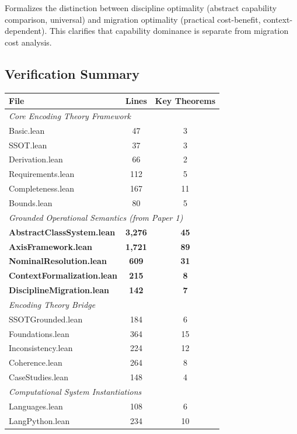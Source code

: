 Formalizes the distinction between discipline optimality (abstract capability comparison, universal) and migration optimality (practical cost-benefit, context-dependent). This clarifies that capability dominance is separate from migration cost analysis.

\subsection{Verification Summary}\label{sec:lean-summary}

\begin{center}
\begin{tabular}{lcc}
\toprule
\textbf{File} & \textbf{Lines} & \textbf{Key Theorems} \\
\midrule
\multicolumn{3}{l}{\textit{Core Encoding Theory Framework}} \\
Basic.lean & 47 & 3 \\
SSOT.lean & 37 & 3 \\
Derivation.lean & 66 & 2 \\
Requirements.lean & 112 & 5 \\
Completeness.lean & 167 & 11 \\
Bounds.lean & 80 & 5 \\
\midrule
\multicolumn{3}{l}{\textit{Grounded Operational Semantics (from Paper 1)}} \\
\textbf{AbstractClassSystem.lean} & \textbf{3,276} & \textbf{45} \\
\textbf{AxisFramework.lean} & \textbf{1,721} & \textbf{89} \\
\textbf{NominalResolution.lean} & \textbf{609} & \textbf{31} \\
\textbf{ContextFormalization.lean} & \textbf{215} & \textbf{8} \\
\textbf{DisciplineMigration.lean} & \textbf{142} & \textbf{7} \\
\midrule
\multicolumn{3}{l}{\textit{Encoding Theory Bridge}} \\
SSOTGrounded.lean & 184 & 6 \\
Foundations.lean & 364 & 15 \\
Inconsistency.lean & 224 & 12 \\
Coherence.lean & 264 & 8 \\
CaseStudies.lean & 148 & 4 \\
\midrule
\multicolumn{3}{l}{\textit{Computational System Instantiations}} \\
Languages.lean & 108 & 6 \\
LangPython.lean & 234 & 10 \\

\end{tabular}
\end{center}

